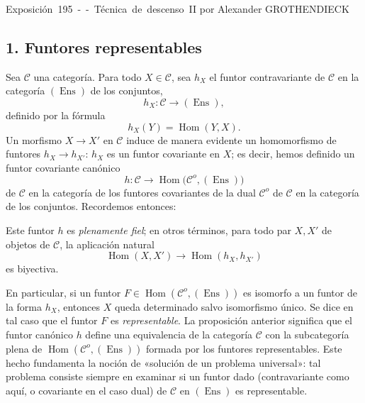 \unit{Exposición 195 -- Técnica de descenso II}
%
  {por Alexander GROTHENDIECK}


\subsection*{1. Funtores representables}

Sea $\mathcal C$ una categoría. Para todo $X\in\mathcal C$, sea $h_X$ el
funtor contravariante de $\mathcal C$ en la categoría $(\operatorname{Ens})$
de los conjuntos,
\[
  h_X:\mathcal C\longrightarrow(\operatorname{Ens}),
\]
definido por la fórmula
\[
  h_X(Y)=\operatorname{Hom}(Y,X).
\]
Un morfismo $X\longrightarrow X'$ en $\mathcal C$ induce de manera evidente un
homomorfismo de funtores $h_X\longrightarrow h_{X'}$: $h_X$ es un funtor
covariante en $X$; es decir, hemos definido un funtor covariante canónico
\[
  h:\mathcal C\longrightarrow
  \operatorname{Hom}\bigl(\mathcal C^o,(\operatorname{Ens})\bigr)
\]
de $\mathcal C$ en la categoría de los funtores covariantes de la dual
$\mathcal C^o$ de $\mathcal C$ en la categoría de los conjuntos. Recordemos
entonces:

 Este funtor $h$ es \emph{plenamente fiel}; en otros
términos, para todo par $X,X'$ de objetos de $\mathcal C$, la aplicación
natural
\[
  \operatorname{Hom}(X,X')\longrightarrow
  \operatorname{Hom}(h_X,h_{X'})
\]
es biyectiva.

En particular, si un funtor
$F\in\operatorname{Hom}(\mathcal C^o,(\operatorname{Ens}))$ es isomorfo a un
funtor de la forma $h_X$, entonces $X$ queda determinado salvo isomorfismo
único. Se dice en tal caso que el funtor $F$ es \emph{representable}. La
proposición anterior significa que el funtor canónico $h$ define una
equivalencia de la categoría $\mathcal C$ con la subcategoría plena de
$\operatorname{Hom}(\mathcal C^o,(\operatorname{Ens}))$ formada por los
funtores representables. Este hecho fundamenta la noción de «solución de un
problema universal»: tal problema consiste siempre en examinar si un funtor
dado (contravariante como aquí, o covariante en el caso dual) de $\mathcal C$
en $(\operatorname{Ens})$ es representable.

